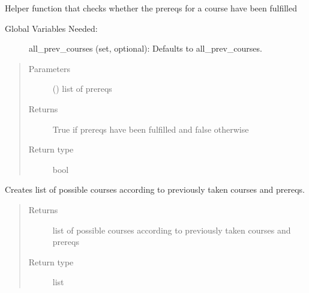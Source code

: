 \documentclass[letterpaper,10pt,english]{sphinxmanual}
\begin{document}

\begin{fulllineitems}
\label{\detokenize{index:optimizer.helper_next_sem_possible_courses_due_to_prereqs}}
Helper function that checks whether the prereqs for a course have been
fulfilled
\begin{description}
\item[{Global Variables Needed:}] \leavevmode
all\_prev\_courses (set, optional): Defaults to all\_prev\_courses.

\end{description}
\begin{quote}\begin{description}
\item[{Parameters}] \leavevmode
{} () \textendash{} list of prereqs

\item[{Returns}] \leavevmode
True if prereqs have been fulfilled and false otherwise

\item[{Return type}] \leavevmode
bool

\end{description}\end{quote}

\end{fulllineitems}


\begin{fulllineitems}
\label{\detokenize{index:optimizer.next_sem_possible_courses_due_to_prereqs}}
Creates list of possible courses according to previously taken courses
and prereqs.
\begin{quote}\begin{description}
\item[{Returns}] \leavevmode
list of possible courses according to previously taken courses
and prereqs

\item[{Return type}] \leavevmode
list

\end{description}\end{quote}

\end{fulllineitems}
\end{document}
